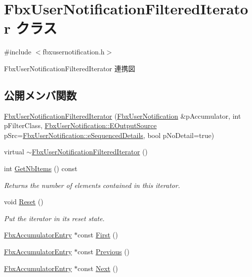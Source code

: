 \hypertarget{class_fbx_user_notification_filtered_iterator}{}\section{Fbx\+User\+Notification\+Filtered\+Iterator クラス}
\label{class_fbx_user_notification_filtered_iterator}


{\ttfamily \#include $<$fbxusernotification.\+h$>$}



Fbx\+User\+Notification\+Filtered\+Iterator 連携図
\subsection*{公開メンバ関数}
\begin{DoxyCompactItemize}
\item 
\hyperlink{class_fbx_user_notification_filtered_iterator_a6e10f51f22b5d4e32fb4acfc4492091f}{Fbx\+User\+Notification\+Filtered\+Iterator} (\hyperlink{class_fbx_user_notification}{Fbx\+User\+Notification} \&p\+Accumulator, int p\+Filter\+Class, \hyperlink{class_fbx_user_notification_a45290aa788e47fce1d7b8a88687aa184}{Fbx\+User\+Notification\+::\+E\+Output\+Source} p\+Src=\hyperlink{class_fbx_user_notification_a45290aa788e47fce1d7b8a88687aa184a4f1172f3c9c59d12a175a66c71be2101}{Fbx\+User\+Notification\+::e\+Sequenced\+Details}, bool p\+No\+Detail=true)
\item 
virtual \hyperlink{class_fbx_user_notification_filtered_iterator_aa6d56d17ef3263a8043dbc73d652143b}{$\sim$\+Fbx\+User\+Notification\+Filtered\+Iterator} ()
\item 
int \hyperlink{class_fbx_user_notification_filtered_iterator_a66548434b844f1099637aa71eb485f9e}{Get\+Nb\+Items} () const
\begin{DoxyCompactList}\small\item\em Returns the number of elements contained in this iterator. \end{DoxyCompactList}\item 
void \hyperlink{class_fbx_user_notification_filtered_iterator_a0cd7bd9eb21f787767d5f603bfb0cf17}{Reset} ()
\begin{DoxyCompactList}\small\item\em Put the iterator in its reset state. \end{DoxyCompactList}\item 
\hyperlink{class_fbx_accumulator_entry}{Fbx\+Accumulator\+Entry} $\ast$const \hyperlink{class_fbx_user_notification_filtered_iterator_a61fc433ba00db459bac761a49e1121a2}{First} ()
\item 
\hyperlink{class_fbx_accumulator_entry}{Fbx\+Accumulator\+Entry} $\ast$const \hyperlink{class_fbx_user_notification_filtered_iterator_a6f53e9356bb96d31bcf1a9fbb342533a}{Previous} ()
\item 
\hyperlink{class_fbx_accumulator_entry}{Fbx\+Accumulator\+Entry} $\ast$const \hyperlink{class_fbx_user_notification_filtered_iterator_a52a38aed0f08e19410e1f45f0eba0115}{Next} ()
\end{DoxyCompactItemize}

